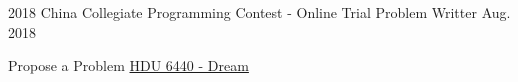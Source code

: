 
\begin{projitem}
    {2018 China Collegiate Programming Contest - Online Trial}
    {Problem Writter}
    {Aug. 2018}{}
    \item Propose a Problem \href{http://acm.hdu.edu.cn/showproblem.php?pid=6440}{HDU 6440 - Dream}
\end{projitem}

\endinput